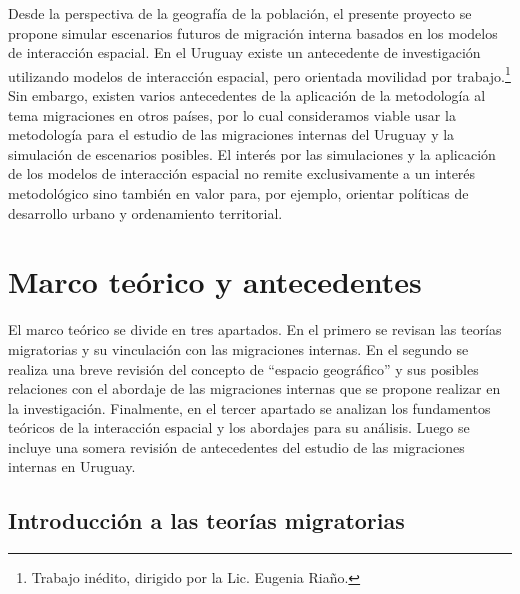 \documentclass[12pt,spanish,]{article}
\begin{document}
Desde la perspectiva de la geografía de la población, el presente
proyecto se propone simular escenarios futuros de migración interna
basados en los modelos de interacción espacial. En el Uruguay existe un
antecedente de investigación utilizando modelos de interacción espacial,
pero orientada movilidad por trabajo.\footnote{Trabajo inédito, dirigido
  por la Lic. Eugenia Riaño.} Sin embargo, existen varios antecedentes
de la aplicación de la metodología al tema migraciones en otros países,
por lo cual consideramos viable usar la metodología para el estudio de
las migraciones internas del Uruguay y la simulación de escenarios
posibles. El interés por las simulaciones y la aplicación de los modelos
de interacción espacial no remite exclusivamente a un interés
metodológico sino también en valor para, por ejemplo, orientar políticas
de desarrollo urbano y ordenamiento territorial.

\newpage

\hypertarget{marco-teuxf3rico-y-antecedentes}{%
\section{Marco teórico y
antecedentes}\label{marco-teuxf3rico-y-antecedentes}}

El marco teórico se divide en tres apartados. En el primero se revisan
las teorías migratorias y su vinculación con las migraciones internas.
En el segundo se realiza una breve revisión del concepto de ``espacio
geográfico'' y sus posibles relaciones con el abordaje de las
migraciones internas que se propone realizar en la investigación.
Finalmente, en el tercer apartado se analizan los fundamentos teóricos
de la interacción espacial y los abordajes para su análisis. Luego se
incluye una somera revisión de antecedentes del estudio de las
migraciones internas en Uruguay.

\hypertarget{introducciuxf3n-a-las-teoruxedas-migratorias}{%
\subsection{Introducción a las teorías
migratorias}\label{introducciuxf3n-a-las-teoruxedas-migratorias}}
\end{document}
